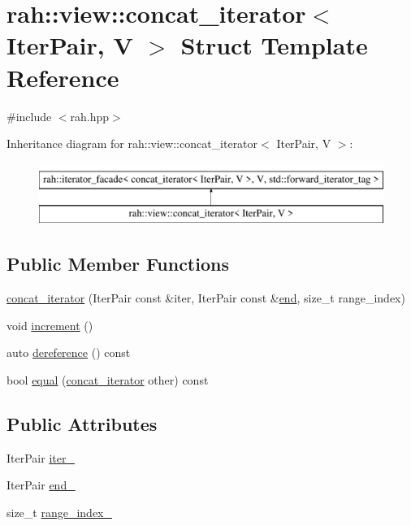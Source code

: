 \hypertarget{structrah_1_1view_1_1concat__iterator}{}\section{rah\+::view\+::concat\+\_\+iterator$<$ Iter\+Pair, V $>$ Struct Template Reference}
\label{structrah_1_1view_1_1concat__iterator}


{\ttfamily \#include $<$rah.\+hpp$>$}

Inheritance diagram for rah\+::view\+::concat\+\_\+iterator$<$ Iter\+Pair, V $>$\+:\begin{figure}[H]
\begin{center}
\leavevmode
\includegraphics[height=2.000000cm]{structrah_1_1view_1_1concat__iterator}
\end{center}
\end{figure}
\subsection*{Public Member Functions}
\begin{DoxyCompactItemize}
\item 
\mbox{\hyperlink{structrah_1_1view_1_1concat__iterator_a45e7ea9b72e7df5390a2ae09a6923d11}{concat\+\_\+iterator}} (Iter\+Pair const \&iter, Iter\+Pair const \&\mbox{\hyperlink{namespacerah_aaddd1442cd76b96876e692cdefe7261d}{end}}, size\+\_\+t range\+\_\+index)
\item 
void \mbox{\hyperlink{structrah_1_1view_1_1concat__iterator_a6301909457da06a9894f4681353442b4}{increment}} ()
\item 
auto \mbox{\hyperlink{structrah_1_1view_1_1concat__iterator_af36beb1e5fbf0614bf42483c582a0e64}{dereference}} () const
\item 
bool \mbox{\hyperlink{structrah_1_1view_1_1concat__iterator_a6e8021ecde205f2ceba2c167a6954d05}{equal}} (\mbox{\hyperlink{structrah_1_1view_1_1concat__iterator}{concat\+\_\+iterator}} other) const
\end{DoxyCompactItemize}
\subsection*{Public Attributes}
\begin{DoxyCompactItemize}
\item 
Iter\+Pair \mbox{\hyperlink{structrah_1_1view_1_1concat__iterator_affb17b45b66a04b01962c8b84dc20c43}{iter\+\_\+}}
\item 
Iter\+Pair \mbox{\hyperlink{structrah_1_1view_1_1concat__iterator_a98e3cb2e64c68c2a5dd34da03293acea}{end\+\_\+}}
\item 
size\+\_\+t \mbox{\hyperlink{structrah_1_1view_1_1concat__iterator_af57a6e3b1baf3641831378c7919e4256}{range\+\_\+index\+\_\+}}
\end{DoxyCompactItemize}


